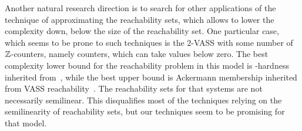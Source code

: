 Another natural research direction is to search for other applications of the technique of approximating the reachability sets,
which allows to lower the complexity down, below the size of the reachability set.
One particular case, which seems to be prone to such techniques is the $2$-VASS with some number of $\mathbb{Z}$-counters, namely counters, which can take values below zero.
The best complexity lower bound for the reachability problem in this model is \pspace-hardness inherited from~\cite{BlondinFGHM15},
while the best upper bound is Ackermann membership inherited from VASS reachability~\cite{LS19}.
The reachability sets for that systems are not necessarily semilinear.
This disqualifies most of the techniques relying on the semilinearity of reachability sets, but our techniques
seem to be promising for that model.


